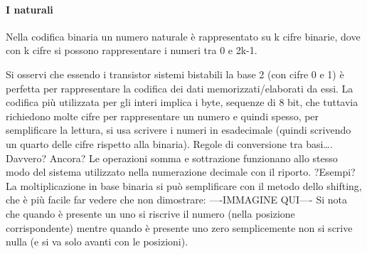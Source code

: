 \paragraph*{I naturali} Nella codifica binaria un numero naturale è rappresentato su k cifre binarie, dove con k cifre si possono rappresentare i numeri tra 0 e 2k-1.

Si osservi che essendo i transistor sistemi bistabili la base 2 (con cifre 0 e 1) è perfetta per rappresentare la codifica dei dati memorizzati/elaborati da essi.
La codifica più utilizzata per gli interi implica i byte, sequenze di 8 bit, che tuttavia richiedono molte cifre per rappresentare un numero e quindi spesso, per semplificare la lettura, si usa scrivere i numeri in esadecimale (quindi scrivendo un quarto delle cifre rispetto alla binaria).
Regole di conversione tra basi…. Davvero? Ancora?
Le operazioni somma e sottrazione funzionano allo stesso modo del sistema utilizzato nella numerazione decimale con il riporto. ?Esempi?
La moltiplicazione in base binaria si può semplificare con il metodo dello shifting, che è più facile far vedere che non dimostrare:  ----IMMAGINE QUI---- 
Si nota che quando è presente un uno si riscrive il numero (nella posizione corrispondente) mentre  quando è presente uno zero semplicemente non si scrive nulla (e si va solo avanti con le posizioni).
